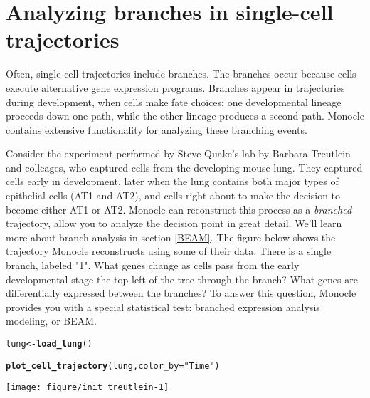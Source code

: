 \documentclass[10pt,oneside]{article}\usepackage[]{graphicx}\usepackage[]{color}
\makeatletter
\def\maxwidth{ %
  \ifdim\Gin@nat@width>\linewidth
    \linewidth
  \else
    \Gin@nat@width
  \fi
}
\newcommand{\hlstr}[1]{\textcolor[rgb]{0.192,0.494,0.8}{#1}}%
\newcommand{\hlstd}[1]{\textcolor[rgb]{0.345,0.345,0.345}{#1}}%
\newcommand{\hlkwb}[1]{\textcolor[rgb]{0.69,0.353,0.396}{#1}}%
\newcommand{\hlkwc}[1]{\textcolor[rgb]{0.333,0.667,0.333}{#1}}%
\newcommand{\hlkwd}[1]{\textcolor[rgb]{0.737,0.353,0.396}{\textbf{#1}}}%
\newenvironment{kframe}{%
 \def\at@end@of@kframe{}%
 \ifinner\ifhmode%
  \def\at@end@of@kframe{\end{minipage}}%
  \begin{minipage}{\columnwidth}%
 \fi\fi%
 \def\FrameCommand##1{\hskip\@totalleftmargin \hskip-\fboxsep
 \colorbox{shadecolor}{##1}\hskip-\fboxsep
     \hskip-\linewidth \hskip-\@totalleftmargin \hskip\columnwidth}%
 \MakeFramed {\advance\hsize-\width
   \@totalleftmargin\z@ \linewidth\hsize
   \@setminipage}}%
 {\par\unskip\endMakeFramed%
 \at@end@of@kframe}
\newenvironment{knitrout}{}{} %
\makeatother
\begin{document}
\section{Analyzing branches in single-cell trajectories} \label{BEAM_trajectory}

Often, single-cell trajectories include branches. The branches occur because cells execute alternative gene expression programs. Branches appear in trajectories during development, when cells make fate choices: one developmental lineage proceeds down one path, while the other lineage produces a second path. Monocle contains extensive functionality for analyzing these branching events. 

Consider the experiment performed by Steve Quake's lab by Barbara Treutlein and colleages, who captured cells from the developing mouse lung. They captured cells early in development, later when the lung contains both major types of epithelial cells (AT1 and AT2), and cells right about to make the decision to become either AT1 or AT2. Monocle can reconstruct this process as a \emph{branched} trajectory, allow you to analyze the decision point in great detail. We'll learn more about branch analysis in section \ref{BEAM}. The figure below shows the trajectory Monocle reconstructs using some of their data. There is a single branch, labeled "1". What genes change as cells pass from the early developmental stage the top left of the tree through the branch? What genes are differentially expressed between the branches? To answer this question, Monocle provides you with a special statistical test: branched expression analysis modeling, or BEAM.

\begin{knitrout}
\color{fgcolor}\begin{kframe}
\begin{alltt}
\hlstd{lung} \hlkwb{<-} \hlkwd{load_lung}\hlstd{()}
\end{alltt}


{\ttfamily\noindent\itshape\color{messagecolor}{\#\# Removing 4 outliers}}\begin{alltt}
\hlkwd{plot_cell_trajectory}\hlstd{(lung,} \hlkwc{color_by}\hlstd{=}\hlstr{"Time"}\hlstd{)}
\end{alltt}
\end{kframe}

{\centering \texttt{[image: figure/init\_treutlein-1]} 

}



\end{knitrout}
\end{document}
